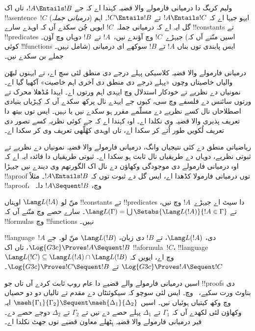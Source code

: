 \documentclass[../../../include/open-logic-section]{subfiles}
\begin{document}


ولیم کریگ دا درمیانی فارمولے والا قضیہ کہندا اے کہ جے $!A
\Entails !B$، تاں اک !!a{sentence}~$!C$ (\emph{درمیانی جملہ}) ایہو جیہا اے کہ $!A \Entails !C$ تے $!C \Entails !B$۔ اہم گل ایہ اے کہ درمیانی جملہ~$!C$ ایویں چُن سکدے آں کہ اوہدے سارے !!{constant}s تے !!{predicate}s جیہڑے~$!C$ وچ آؤندے نیں،~$!A$ تے~$!B$ دوہاں وچ آؤن۔ (اسیں منّنے آں کہ کوئی !!{function}s شامل نہیں۔) ایس پابندی توں بناں $!A$ تے $!B$ سوکھے ای درمیانی جملے بن سکدے نیں۔

درمیانی فارمولے والا قضیہ کلاسیکی پہلے درجے دی منطق لئی سچ اے، تے ایہنوں لبھّن والیاں خاصیتاں وچوں «پہلے درجے دی منطق دی آخری اہم خاصیت» آکھیا گیا اے۔ نمونیاں دے نظریے تے خودکار استدلال وچ ایہدی اہم ورتوں اے۔ ایہدا مُڈھلا محرک تے ورتوں سائنس دے فلسفے وچ سی، کیوں جے ایہدے نال پرکھ سکدے آں کہ کِہڑیاں بنیادی اصطلاحاں نال کسے نظریے دے مسلّمے مقرر ہو سکدے نیں یا نہیں۔ ایس توں بیتھ دا تعریف پذیری والا قضیہ وی نکلدا اے۔ اوہ کہندا اے کہ جے کوئی نظریہ کسے تصور دی تعریف لُکویں طور اُتے کر سکدا اے، تاں اوہدی کھُلّھی تعریف وی کر سکدا اے۔

ریاضیاتی منطق دے کئی نتیجیاں وانگ، درمیانی فارمولے والا قضیہ نمونیاں دے نظریے تے ثبوتی نظریے، دوہاں دے طریقیاں نال ثابت ہو سکدا اے۔ ثبوتی طریقیاں دا فائدہ ایہ اے کہ اوہ درمیانی فارمولے دی موجودگی وکھاؤن دے نال اک الگورتھم وی دیندے نیں جیہڑا !!a{proof} توں درمیانی فارمولا کڈھدا اے، ایس گل دے ثبوت توں کہ $!A \Entails !B$۔ مثلاً !!a{proof}،~ وچ، $!A \Sequent !B$ دا۔

منّ لو $\Lang L(!A)$ اوہناں !!{constant}s تے !!{predicate}s دا سیٹ اے جیہڑے~$!A$ وچ نیں، تے $\Lang L(\Gamma) = \bigcup \Setabs{\Lang L(!A)}{!A \in
\Gamma}$۔ سارے حصے وچ منّنے آں کہ !!{formula}s وچ !!{function}s نہیں۔

\begin{thm}
!!{language}~$!A$ دی، $\Lang L(!A)$، تے $!B$ دی زبان، $\Lang L(!B)$ منّ لو۔ جے $\Log{G3c} \Proves !A \Sequent !B$، تاں اک !!a{formula}~$!C$، !!{language}~$\Lang L(!C) \subseteq \Lang
L(!A) \cap \Lang L(!B)$ وچ اے، ایویں کہ $\Log{G3c} \Proves !A \Sequent !C$ تے $\Log{G3c} \Proves !C \Sequent !B$۔
\end{thm}

اسیں درمیانی فارمولے والے قضیے دا عام روپ ثابت کردے آں تاں جو !!{proof}s دی بناوٹ ورت سکیے،~ وچ۔ ایس لئی سوچو کہ سیکوئنٹاں دے مقدم تے تالیاں دو دو حصیاں وچ وکھ کیتیاں ہوئیاں نیں۔ اسیں $\maeh{\Gamma_1}{\Gamma_2} \Sequent
\maeh{\Delta_1}{\Delta_2}$ ایہ وکھاؤن لئی لکھدے آں کہ $\Gamma_1$ تے $\Delta_1$ پہلے حصے دے نیں تے $\Gamma_2$ تے $\Delta_2$ دوجے حصے دے۔ فیر درمیانی فارمولے والا قضیہ ہِٹھلے معاون قضیے توں جھٹ نکلدا اے۔
\end{document}
